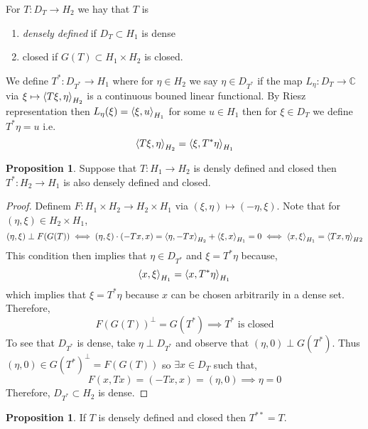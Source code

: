 \documentclass[12pt]{extarticle}
\newcommand{\C}{\mathbb{C}}
\theoremstyle{definition}
\newtheorem{proposition}[theorem]{Proposition}
\newenvironment{definition}[1][Definition:]{\begin{trivlist}
\item[\hskip \labelsep {\bfseries #1}]}{\end{trivlist}}
\begin{document}
\begin{definition}
For $T : D_T \to H_2$ we hay that $T$ is
\begin{enumerate}
\item \textit{densely defined} if $D_T \subset H_1$ is dense

\item closed if $G(T) \subset H_1 \times H_2$ is closed.
\end{enumerate}
\end{definition}

\begin{definition}
We define $T^* : D_{T^*} \to H_1$ where for $\eta \in H_2$ we say $\eta \in D_{T^*}$ if the map $L_\eta : D_T \to \C$ via $\xi \mapsto \left< T \xi, \eta \right>_{H_2}$ is a continuous bouned linear functional. By Riesz representation then $L_\eta(\xi) = \left< \xi, u \right>_{H_1}$ for some $u \in H_1$ then for $\xi \in D_T$ we define $T^* \eta = u$ i.e.
\[ \left< T \xi, \eta \right>_{H_2} = \left< \xi, T^* \eta \right>_{H_1} \] 
\end{definition}

\begin{proposition}
Suppose that $T : H_1 \to H_2$ is densly defined and closed then $T^* : H_2 \to H_1$ is also densely defined and closed.
\end{proposition}

\begin{proof}
Definem $F : H_1 \times H_2 \to H_2 \times H_1$ via $(\xi, \eta) \mapsto (-\eta, \xi)$. Note that for $(\eta,\xi) \in H_2 \times H_1$,
\[ (\eta, \xi) \perp F(G(T)) \iff (\eta, \xi) \cdot (-Tx, x) = \left< \eta, -Tx \right>_{H_2} + \left< \xi, x \right>_{H_1} = 0 \iff \left< x, \xi \right>_{H_1} = \left< Tx, \eta \right>_{H2} \] 
This condition then implies that $\eta \in D_{T^*}$ and $\xi = T^* \eta$ because,
\[ \left< x, \xi \right>_{H_1} = \left< x, T^* \eta \right>_{H_1} \]
which implies that $\xi = T^* \eta$ because $x$ can be chosen arbitrarily in a dense set. Therefore,
\[ F(G(T))^\perp = G(T^*) \implies T^* \text{ is closed} \]
To see that $D_{T^*}$ is dense, take $\eta \perp D_{T^*}$ and observe that $(\eta, 0) \perp G(T^*)$. Thus $(\eta, 0) \in G(T^*)^\perp = F(G(T))$ so $\exists x \in D_T$ such that,
\[ F(x, Tx) = (-Tx, x) = (\eta, 0) \implies \eta = 0 \]
Therefore, $D_{T^*} \subset H_2$ is dense. 
\end{proof}

\begin{proposition}
If $T$ is densely defined and closed then $T^{**} = T$. 
\end{proposition}
\end{document}
